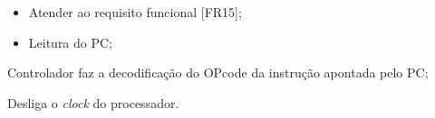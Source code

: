 \documentclass{article}
\begin{document}
  \preconditions 
  \begin{itemize}
  	\item Atender ao requisito funcional [FR15];
  	\item Leitura do PC;
  \end{itemize}
    
  
  \begin{mainflow}
  	\item Controlador faz a  decodificação do OPcode da instrução apontada pelo PC;
  	\item Desliga o \textit{clock} do processador.
  \end{mainflow} 

% 
% 
\end{document}
